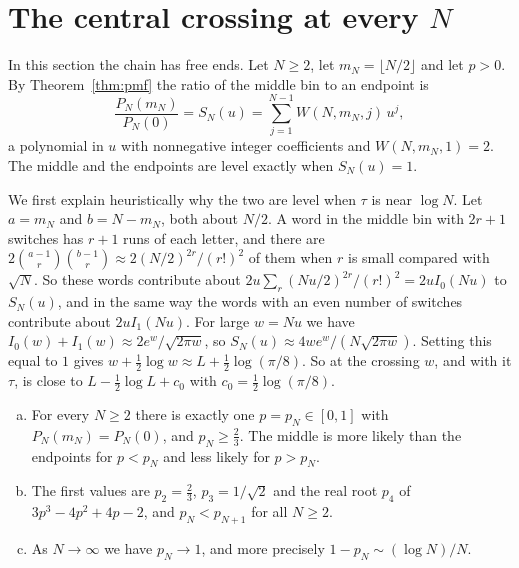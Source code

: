 \section{The central crossing at every \texorpdfstring{$N$}{N}}\label{sec:middle}

In this section the chain has free ends. Let $N\ge2$, let $m_N=\lfloor N/2\rfloor$
and let $p>0$. By Theorem~\ref{thm:pmf} the ratio of the middle bin to an
endpoint is
\begin{equation}\label{eq:SN}
\frac{P_N(m_N)}{P_N(0)}=S_N(u)=\sum_{j=1}^{N-1}W(N,m_N,j)\,u^j ,
\end{equation}
a polynomial in $u$ with nonnegative integer coefficients and
$W(N,m_N,1)=2$. The middle and the endpoints are level exactly when
$S_N(u)=1$.

We first explain heuristically why the two are level when $\tau$ is near $\log N$.
Let $a=m_N$ and
$b=N-m_N$, both about $N/2$. A word in the middle bin with $2r+1$ switches has
$r+1$ runs of each letter, and there are
$2\binom{a-1}r\binom{b-1}r\approx2(N/2)^{2r}/(r!)^2$ of them when $r$ is small
compared with $\sqrt N$. So these words contribute about
$2u\sum_r(Nu/2)^{2r}/(r!)^2=2uI_0(Nu)$ to $S_N(u)$, and in the same way the
words with an even number of switches contribute about $2uI_1(Nu)$. For large
$w=Nu$ we have $I_0(w)+I_1(w)\approx2e^w/\sqrt{2\pi w}$, so
$S_N(u)\approx4we^w/(N\sqrt{2\pi w})$. Setting this equal to $1$ gives
$w+\frac12\log w\approx L+\frac12\log(\pi/8)$. So at the crossing $w$, and with
it $\tau$, is close to $L-\frac12\log L+c_0$ with $c_0=\frac12\log(\pi/8)$.

\begin{theorem}\label{thm:root}
\begin{enumerate}[(a)]
\item For every $N\ge2$ there is exactly one $p=p_N\in[0,1]$ with
$P_N(m_N)=P_N(0)$, and $p_N\ge\tfrac23$. The middle is more likely than the
endpoints for $p<p_N$ and less likely for $p>p_N$.
\item The first values are $p_2=\tfrac23$, $p_3=1/\sqrt2$ and the real root
$p_4$ of $3p^3-4p^2+4p-2$, and $p_N<p_{N+1}$ for all $N\ge2$.
\item As $N\to\infty$ we have $p_N\to1$, and more precisely
$1-p_N\sim(\log N)/N$.
\end{enumerate}
\end{theorem}

